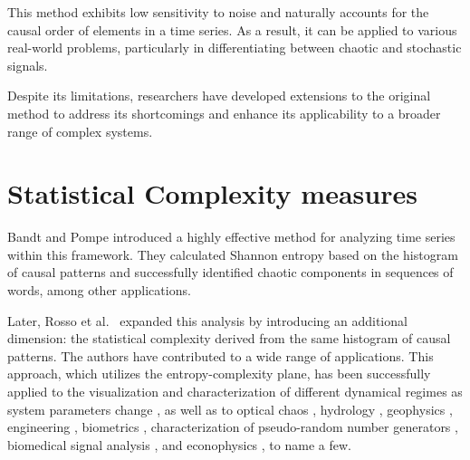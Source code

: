 This method exhibits low sensitivity to noise and naturally accounts for the causal order of elements in a time series. As a result, it can be applied to various real-world problems, particularly in differentiating between chaotic and stochastic signals.

Despite its limitations, researchers have developed extensions to the original method to address its shortcomings and enhance its applicability to a broader range of complex systems.

\section{Statistical Complexity measures} \label{Sec:BackgroundKnowledge}

Bandt and Pompe introduced a highly effective method for analyzing time series within this framework. They calculated Shannon entropy based on the histogram of causal patterns and successfully identified chaotic components in sequences of words, among other applications.

Later, Rosso et al.~\cite{EEGAnalysisUsingWaveletBasedInformationTools} expanded this analysis by introducing an additional dimension: the statistical complexity derived from the same histogram of causal patterns. The authors have contributed to a wide range of applications. This approach, which utilizes the entropy-complexity plane, has been successfully applied to the visualization and characterization of different dynamical regimes as system parameters change  \cite{Bandt2005,Cao2004,DeMicco2012a,Kowalski2007,Kowalski2011b,Rosso2010a,Zunino2010a,Zunino2012a}, as well as to optical chaos \cite{Liu2016f,Soriano2011a,Toomey2014,Yang2015e,Zunino2011a}, hydrology \cite{Lange2013,Serinaldi2014,Stosic2016}, geophysics \cite{Consolini2014,Saco2010,Sippel2016}, engineering \cite{Aquino2017,Aquino2015,Redelico2017a,Yan2012}, biometrics \cite{Rosso2016}, characterization of pseudo-random number generators \cite{DeMicco2008,DeMicco2009}, biomedical signal analysis \cite{Li2014b,Li2008b,Li2007,Liang2015b,Montani2015a,Montani2014,Montani2014a,Montani2015,Morabito2012,Parlitz2012,Perinelli2025,Perinelli2019,Zanin2012}, and econophysics \cite{Bariviera2015a,Bariviera2015,Bariviera2016,Zanin2012,Zunino2016a,Zunino2009,Zunino2010}, to name a few.

